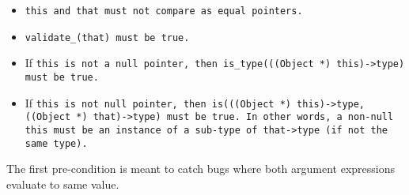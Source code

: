 \begin{itemize}[nosep]

\item \tt{this} and \tt{that} must not compare as equal pointers.

\item \tt{validate_(that)} must be \tt{true}.

\item If \tt{this} is not a null pointer, then
\tt{is_type(((Object *) this)->type)} must be \tt{true}.

\item If \tt{this} is not null pointer, then
\tt{is(((Object *) this)->type, ((Object *) that)->type)} must be \tt{true}.
In other words, a non-null \tt{this} must be an instance of
a sub-type of \tt{that->type} (if not the same type).

\end{itemize}

\note The first pre-condition is meant to catch bugs
where both argument expressions evaluate to same value.
